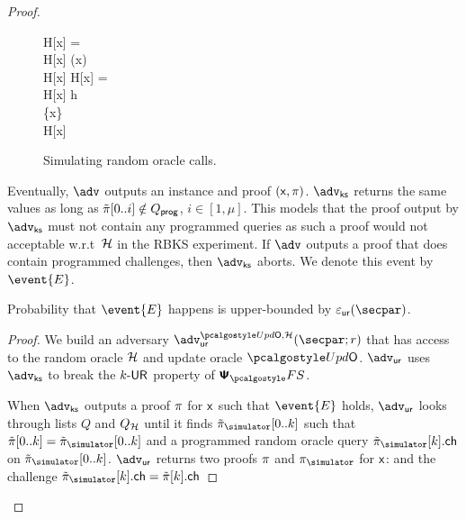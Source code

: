 \begin{proof}
	
	\begin{figure}
		\centering
			\begin{pcvstack}
			\begin{pchstack}
				{
				\pcif H[x] = \bot \pcthen \\
				\pcind H[x] \gets \ro(x) \\
				\pcreturn H[x]
		  		}
				\pchspace
				{ 
					\pcif H[x] = \bot \pcthen \\ 
					\pcind H[x] \gets h \\
					\pcind \Qprog \gets \Qprog \cup \{x\}\\
					\pcreturn H[x]
				}
			\end{pchstack}
		\end{pcvstack}
		\caption{Simulating random oracle calls.}
		\label{fig:simulator_oracles}
	\end{figure}	
%

	Eventually, $\advse$ outputs an instance and proof $(\mathsf{x}, \pi)$. $\advcss$ returns the same values as long as $\tilde{\pi}[0..i] \notin Q_{\mathsf{prog}}$, $i\in[1,\mu]$. This models that the proof output by $\advcss$ must not contain any programmed queries as such a proof would not acceptable w.r.t~$\mathcal{H}$ in the RBKS experiment. If $\advse$ outputs a proof that does contain programmed challenges, then $\advcss$ aborts. We denote this event by $\event{E}$.
	
	\begin{lemma}
		Probability that $\event{E}$ happens is upper-bounded by $\epsur(\secpar)$. 
	\end{lemma}
	\begin{proof}

	We build an adversary $\advur^{\initU, \ro} (\secpar; r)$ that has access to the random oracle $\mathcal{H}$ and update oracle $\initU$. $\advur$ uses $\advcss$ to break the ${k\text{-}\mathsf{UR}}$ property of $\psfs$. 

	When $\advcss$ outputs a proof $\pi$ for $\mathsf{x}$ such that $\event{E}$ holds, $\advur$ looks through lists $Q$ and $Q_{\mathcal{H}}$ until it finds $\tzkproofs[0..k]$ such that $\tzkproof[0..k] = \tzkproofs[0..k]$ and a programmed random oracle query $\tzkproofs[k].\ch$ on $\tzkproofs[0..k]$.	$\advur$ returns two proofs $\pi$ and $\zkproofs$ for $\mathsf{x}$:
		and the challenge $\tzkproofs[k].\ch=\tzkproof[k].\ch$


\end{proof}
\end{proof}
